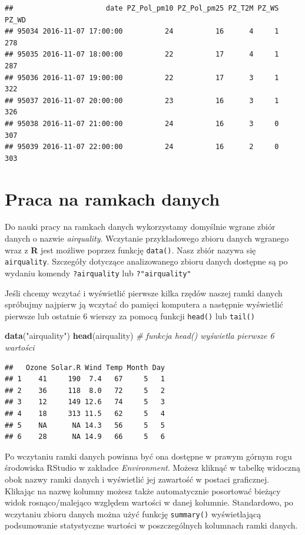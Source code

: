 \documentclass[]{book}
\newenvironment{Shaded}{\begin{snugshade}}{\end{snugshade}}
\newcommand{\KeywordTok}[1]{\textcolor[rgb]{0.13,0.29,0.53}{\textbf{#1}}}
\newcommand{\StringTok}[1]{\textcolor[rgb]{0.31,0.60,0.02}{#1}}
\newcommand{\CommentTok}[1]{\textcolor[rgb]{0.56,0.35,0.01}{\textit{#1}}}
\newcommand{\NormalTok}[1]{#1}
\theoremstyle{definition}
\theoremstyle{definition}
\theoremstyle{definition}
\theoremstyle{remark}
\begin{document}
\begin{verbatim}
##                      date PZ_Pol_pm10 PZ_Pol_pm25 PZ_T2M PZ_WS PZ_WD
## 95034 2016-11-07 17:00:00          24          16      4     1   278
## 95035 2016-11-07 18:00:00          22          17      4     1   287
## 95036 2016-11-07 19:00:00          22          17      3     1   322
## 95037 2016-11-07 20:00:00          23          16      3     1   326
## 95038 2016-11-07 21:00:00          24          16      3     0   307
## 95039 2016-11-07 22:00:00          24          16      2     0   303
\end{verbatim}

\section{Praca na ramkach danych}\label{praca-na-ramkach-danych}

Do nauki pracy na ramkach danych wykorzystamy domyślnie wgrane zbiór
danych o nazwie \emph{airquality}. Wczytanie przykładowego zbioru danych
wgranego wraz z \textbf{R} jest możliwe poprzez funkcję \texttt{data()}.
Nasz zbiór nazywa się \texttt{airquality}. Szczegóły dotyczące
analizowanego zbioru danych dostępne są po wydaniu komendy
\texttt{?airquality} lub \texttt{?"airquality"}

Jeśli chcemy wczytać i wyświetlić pierwsze kilka rzędów naszej ramki
danych spróbujmy najpierw ją wczytać do pamięci komputera a następnie
wyświetlić pierwsze lub ostatnie 6 wierszy za pomocą funkcji
\texttt{head()} lub \texttt{tail()}

\begin{Shaded}
\begin{Highlighting}[]
\KeywordTok{data}\NormalTok{(}\StringTok{"airquality"}\NormalTok{)}
\KeywordTok{head}\NormalTok{(airquality) }\CommentTok{# funkcja head() wyświetla pierwsze 6 wartości}
\end{Highlighting}
\end{Shaded}

\begin{verbatim}
##   Ozone Solar.R Wind Temp Month Day
## 1    41     190  7.4   67     5   1
## 2    36     118  8.0   72     5   2
## 3    12     149 12.6   74     5   3
## 4    18     313 11.5   62     5   4
## 5    NA      NA 14.3   56     5   5
## 6    28      NA 14.9   66     5   6
\end{verbatim}

Po wczytaniu ramki danych powinna być ona dostępne w prawym górnym rogu
środowiska RStudio w zakładce \emph{Environment}. Możesz kliknąć w
tabelkę widoczną obok nazwy ramki danych i wyświetlić jej zawartość w
postaci graficznej. Klikając na nazwę kolumny możesz także automatycznie
posortować bieżący widok rosnąco/malejąco względem wartości w danej
kolumnie. Standardowo, po wczytaniu zbioru danych można użyć funkcję
\texttt{summary()} wyświetlającą podsumowanie statystyczne wartości w
poszczególnych kolumnach ramki danych.
\end{document}
